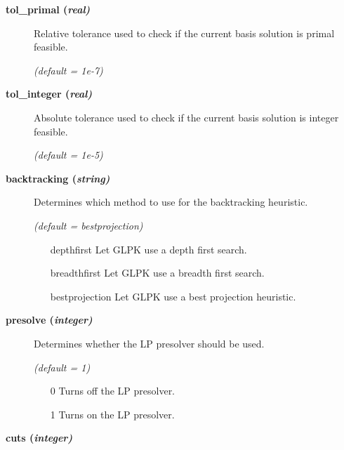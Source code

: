 \begin{description}
\item[\label{glpktol_primal}\hypertarget{glpktol_primal}
{\textbf{tol\_primal (\slshape{real})}}]\hspace{1.0in}

Relative tolerance used to check if the current basis solution is primal feasible.

\textsl{(default = 1e-7)}

\item[\label{glpktol_integer}\hypertarget{glpktol_integer}
{\textbf{tol\_integer (\slshape{real})}}]\hspace{1.0in}

Absolute tolerance used to check if the current basis solution is integer feasible.

\textsl{(default = 1e-5)}

\item[\label{backtracking}\hypertarget{backtracking}
{\textbf{backtracking (\slshape{string})}}]\hspace{1.0in}

Determines which method to use for the backtracking heuristic.

\textsl{(default = bestprojection)}
\begin{itemize}
\item[depthfirst] 
Let GLPK use a depth first search.
\item[breadthfirst] 
Let GLPK use a breadth first search.
\item[bestprojection] 
Let GLPK use a best projection heuristic.
\end{itemize}

\item[\label{glpkpresolve}\hypertarget{glpkpresolve}
{\textbf{presolve (\slshape{integer})}}]\hspace{1.0in}

Determines whether the LP presolver should be used.

\textsl{(default = 1)}
\begin{itemize}
\item[0] 
Turns off the LP presolver.
\item[1] 
Turns on the LP presolver.
\end{itemize}

\item[\label{glpkcuts}\hypertarget{glpkcuts}
{\textbf{cuts (\slshape{integer})}}]\hspace{1.0in}


\end{description}
